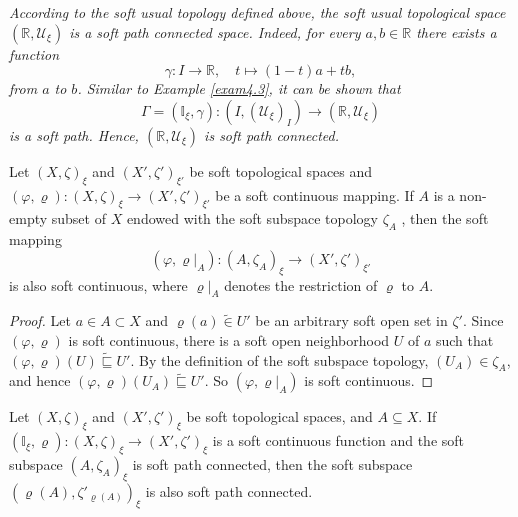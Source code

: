 \documentclass[preprint,12pt]{elsarticle}
\begin{document}
\begin{ex}\em{According to the soft usual topology defined above, the soft usual topological space
$(\mathbb{R}, \mathscr{U}_\xi)$ is a soft path connected space. Indeed, for every
$a, b \in \mathbb{R}$ there exists a function
\[
\gamma \colon I \to \mathbb{R}, \quad t \mapsto (1-t)a + tb,
\]
from $a$ to $b$. Similar to Example \ref{exam4.3}, it can be shown that \[
\Gamma =(\mathbb{I}_\xi ,\gamma) \colon (I,(\mathscr{U}_{\xi})_{I})\to  (\mathbb{R}, \mathscr{U}_\xi)
\] is a soft path.
Hence, $(\mathbb{R}, \mathscr{U}_\xi)$ is soft path connected.}
\end{ex}

 \begin{prop}\label{restricted}
  Let $(X,\zeta)_\xi$ and $(X',\zeta')_{\xi'}$ be soft topological spaces and  $(\varphi, \varrho): (X,\zeta)_\xi \to (X',\zeta')_{\xi'}$ be a soft continuous mapping. If $A$ is a non-empty subset of $X$ endowed with the soft subspace topology $\zeta_A$ , then  the soft mapping $$(\varphi, \varrho|_A): (A, \zeta_A)_\xi \to (X',\zeta')_{\xi'}$$
is also soft continuous, where $\varrho|_A$ denotes the restriction of $\varrho$ to $A$.
 \end{prop}
\begin{proof}
 Let $a\in A \subset X$ and  $\varrho(a)\widetilde{\in}U'$ be an arbitrary soft open set in $\zeta'$. Since $(\varphi, \varrho)$ is soft continuous, there is a soft open  neighborhood \( U \) of \( a \) such that
 \((\varphi, \varrho)(U) \widetilde{\sqsubseteq} U'\). By the definition of the soft subspace topology, $(U _ A) \in \zeta_{A}$, and hence $(\varphi, \varrho)(U_ A) \widetilde{\sqsubseteq} U'$. So $(\varphi, \varrho|_A)$ is soft continuous.
\end{proof}

\begin{thm}\label{preservepathcon}
Let $(X,\zeta)_\xi$ and $(X',\zeta')_{\xi}$ be soft topological spaces, and $A\subseteq X$.
If $(\mathbb{I}_\xi,\varrho):(X,\zeta)_\xi\to (X',\zeta')_{\xi}$ is a soft continuous function and the soft  subspace $(A,\zeta_A)_\xi$ is soft path connected, then the soft subspace $(\varrho(A),\zeta'_{\varrho(A)})_{\xi}$ is also soft path connected.
\end{thm}
\end{document}

